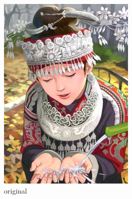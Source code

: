 \documentclass[a4paper]{book}
\begin{document}
\begin{figure}[t]
    \centering
    \begin{subfigure}{.24\linewidth}
        \includegraphics[width=\linewidth]{images/comic_HR.jpg}
        \caption{original}
        \label{fig:srgan_orig}
    \end{subfigure}
    \begin{subfigure}{.24\linewidth}

\end{subfigure}
\end{figure}
\end{document}
